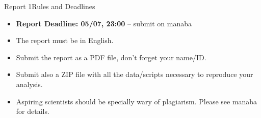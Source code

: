 \documentclass[aspectratio=169]{beamer}
\begin{document}
\begin{frame}[t]{Report 1}{Rules and Deadlines}
  \begin{itemize}
    \item {\bf Report Deadline: 05/07, 23:00} -- submit on manaba\bigskip

    \item The report must be in English.\bigskip

    \item Submit the report as a PDF file, don't forget your name/ID.
    \item Submit also a ZIP file with all the data/scripts necessary to reproduce your analysis.
    \bigskip

  \item \alert{Aspiring scientists should be specially wary of
      plagiarism. Please see manaba for details.}
  \end{itemize}

\end{frame}



\end{document}

